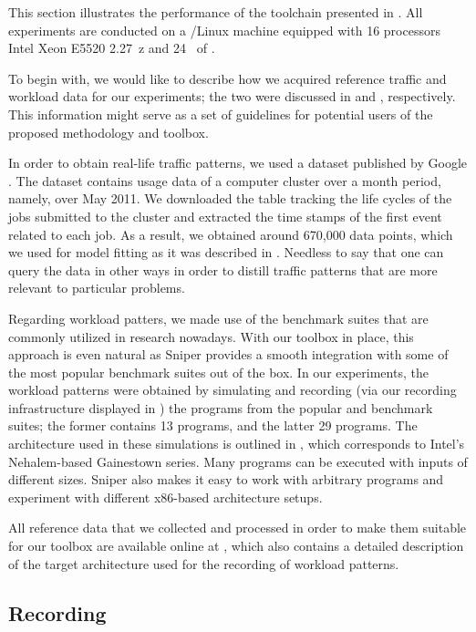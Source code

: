 
This section illustrates the performance of the toolchain presented in
. All experiments are conducted on a /Linux machine
equipped with 16 processors Intel Xeon E5520 2.27~z and 24~ of
.

To begin with, we would like to describe how we acquired reference traffic and
workload data for our experiments; the two were discussed in  and
, respectively. This information might serve as a set of
guidelines for potential users of the proposed methodology and toolbox.

In order to obtain real-life traffic patterns, we used a dataset published by
Google \cite{google}. The dataset contains usage data of a computer cluster over
a month period, namely, over May 2011. We downloaded the table tracking the life
cycles of the jobs submitted to the cluster and extracted the time stamps of the
first event related to each job. As a result, we obtained around 670,000 data
points, which we used for model fitting as it was described in .
Needless to say that one can query the data in other ways in order to distill
traffic patterns that are more relevant to particular problems.

Regarding workload patters, we made use of the benchmark suites that are
commonly utilized in research nowadays. With our toolbox in place, this approach
is even natural as Sniper provides a smooth integration with some of the most
popular benchmark suites out of the box. In our experiments, the workload
patterns were obtained by simulating and recording (via our recording
infrastructure displayed in ) the programs from the popular
 \cite{bienia2011} and  \cite{cpu2006} benchmark
suites; the former contains 13 programs, and the latter 29 programs. The
architecture used in these simulations is outlined in , which
corresponds to Intel's Nehalem-based Gainestown series. Many programs can be
executed with inputs of different sizes. Sniper also makes it easy to work with
arbitrary programs and experiment with different x86-based architecture setups.

All reference data that we collected and processed in order to make them
suitable for our toolbox are available online at \cite{sources}, which also
contains a detailed description of the target architecture used for the
recording of workload patterns.

\subsection{Recording}


